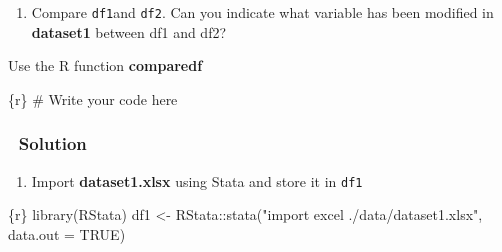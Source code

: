 \documentclass[
  letterpaper,
  DIV=11,
  numbers=noendperiod]{scrreprt}
\newenvironment{Shaded}{\begin{snugshade}}{\end{snugshade}}
\newcommand{\AttributeTok}[1]{\textcolor[rgb]{0.40,0.45,0.13}{#1}}
\newcommand{\CommentTok}[1]{\textcolor[rgb]{0.37,0.37,0.37}{#1}}
\newcommand{\ConstantTok}[1]{\textcolor[rgb]{0.56,0.35,0.01}{#1}}
\newcommand{\FunctionTok}[1]{\textcolor[rgb]{0.28,0.35,0.67}{#1}}
\newcommand{\InformationTok}[1]{\textcolor[rgb]{0.37,0.37,0.37}{#1}}
\newcommand{\NormalTok}[1]{\textcolor[rgb]{0.00,0.23,0.31}{#1}}
\newcommand{\OtherTok}[1]{\textcolor[rgb]{0.00,0.23,0.31}{#1}}
\newcommand{\SpecialCharTok}[1]{\textcolor[rgb]{0.37,0.37,0.37}{#1}}
\newcommand{\StringTok}[1]{\textcolor[rgb]{0.13,0.47,0.30}{#1}}
\providecommand{\tightlist}{%
  \setlength{\itemsep}{0pt}\setlength{\parskip}{0pt}}\usepackage{longtable,booktabs,array}
\begin{document}
\begin{enumerate}
\def\labelenumi{\arabic{enumi}.}
\setcounter{enumi}{2}
\tightlist
\item
  Compare \texttt{df1}and \texttt{df2}. Can you indicate what variable
  has been modified in \textbf{dataset1} between df1 and df2?
\end{enumerate}

\begin{tcolorbox}[enhanced jigsaw, colframe=quarto-callout-tip-color-frame, colback=white, rightrule=.15mm, bottomrule=.15mm, left=2mm, arc=.35mm, coltitle=black, title=\textcolor{quarto-callout-tip-color}{\faLightbulb}\hspace{0.5em}{Tip}, opacitybacktitle=0.6, bottomtitle=1mm, opacityback=0, toptitle=1mm, toprule=.15mm, colbacktitle=quarto-callout-tip-color!10!white, titlerule=0mm, leftrule=.75mm, breakable]
Use the R function \textbf{comparedf}
\end{tcolorbox}

\begin{Shaded}
\begin{Highlighting}[]
\InformationTok{\textasciigrave{}\textasciigrave{}\textasciigrave{}\{r\}}
\CommentTok{\# Write your code here}
\InformationTok{\textasciigrave{}\textasciigrave{}\textasciigrave{}}
\end{Highlighting}
\end{Shaded}

\hypertarget{solution}{%
\subsubsection{\texorpdfstring{{👀}
Solution}{👀 Solution}}\label{solution}}

\begin{enumerate}
\def\labelenumi{\arabic{enumi}.}
\tightlist
\item
  Import \textbf{dataset1.xlsx} using Stata and store it in \texttt{df1}
\end{enumerate}

\begin{Shaded}
\begin{Highlighting}[]
\InformationTok{\textasciigrave{}\textasciigrave{}\textasciigrave{}\{r\}}
\FunctionTok{library}\NormalTok{(RStata)}
\NormalTok{df1 }\OtherTok{\textless{}{-}}\NormalTok{ RStata}\SpecialCharTok{::}\FunctionTok{stata}\NormalTok{(}\StringTok{"import excel ./data/dataset1.xlsx"}\NormalTok{,}
                     \AttributeTok{data.out =} \ConstantTok{TRUE}\NormalTok{)}
\InformationTok{\textasciigrave{}\textasciigrave{}\textasciigrave{}}
\end{Highlighting}
\end{Shaded}
\end{document}
